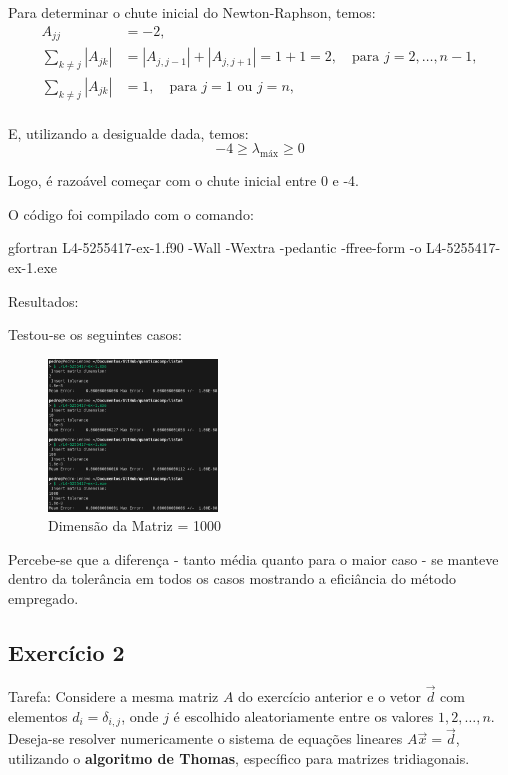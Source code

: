 \documentclass[12pt, a4paper]{article} %
\begin{document}
        Para determinar o chute inicial do Newton-Raphson, temos:
        \begin{align*}
            A_{jj} &= -2, \\
            \sum_{k \ne j} |A_{jk}| &= |A_{j, j-1}| + |A_{j, j+1}| = 1 + 1 = 2, \quad \text{para } j = 2, \ldots, n-1, \\
            \sum_{k \ne j} |A_{jk}| &= 1, \quad \text{para } j = 1 \text{ ou } j = n, \\
        \end{align*}

        E, utilizando a desigualde dada, temos:
        \begin{equation*}
            -4 \geq \lambda_{\text{máx}} \geq 0
        \end{equation*}

        Logo, \'e razoável começar com o chute inicial entre 0 e -4.

        O c\'odigo foi compilado com o comando:

    gfortran L4-5255417-ex-1.f90 -Wall -Wextra -pedantic -ffree-form -o L4-5255417-ex-1.exe  

        Resultados:

        Testou-se os seguintes casos:
        \begin{figure}[H]
            \centering
            \includegraphics[width=0.4\textwidth]{../images/ex1-input.png}
            \caption{Dimens\~ao da Matriz = 1000}
        \end{figure}

        Percebe-se que a diferen\c{c}a - tanto m\'edia quanto para o maior caso - se manteve dentro da toler\^ancia em todos os casos mostrando a efici\^ancia do m\'etodo empregado.

    \subsection{Exerc\'icio 2}

        Tarefa: Considere a mesma matriz $A$ do exerc\'icio anterior e o vetor $\vec{d}$ com elementos $d_i = \delta_{i,j}$, onde $j$ \'e escolhido aleatoriamente entre os valores $1, 2, \dots, n$. Deseja-se resolver numericamente o sistema de equa\c{c}\~oes lineares $A \vec{x} = \vec{d}$, utilizando o \textbf{algoritmo de Thomas}, espec\'ifico para matrizes tridiagonais.
\end{document}
